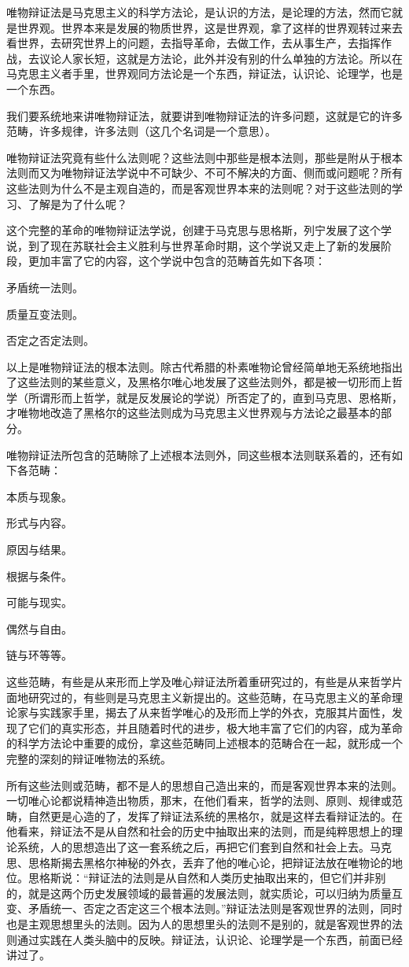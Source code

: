 唯物辩证法是马克思主义的科学方法论，是认识的方法，是论理的方法，然而它就是世界观。世界本来是发展的物质世界，这是世界观，拿了这样的世界观转过来去看世界，去研究世界上的问题，去指导革命，去做工作，去从事生产，去指挥作战，去议论人家长短，这就是方法论，此外并没有别的什么单独的方法论。所以在马克思主义者手里，世界观同方法论是一个东西，辩证法，认识论、论理学，也是一个东西。

我们要系统地来讲唯物辩证法，就要讲到唯物辩证法的许多问题，这就是它的许多范畴，许多规律，许多法则（这几个名词是一个意思）。

唯物辩证法究竟有些什么法则呢？这些法则中那些是根本法则，那些是附从于根本法则而又为唯物辩证法学说中不可缺少、不可不解决的方面、侧而或问题呢？所有这些法则为什么不是主观自造的，而是客观世界本来的法则呢？对于这些法则的学习、了解是为了什么呢？

这个完整的革命的唯物辩证法学说，创建于马克思与思格斯，列宁发展了这个学说，到了现在苏联社会主义胜利与世界革命时期，这个学说又走上了新的发展阶段，更加丰富了它的内容，这个学说中包含的范畴首先如下各项：

矛盾统一法则。

质量互变法则。

否定之否定法则。

以上是唯物辩证法的根本法则。除古代希腊的朴素唯物论曾经简单地无系统地指出了这些法则的某些意义，及黑格尔唯心地发展了这些法则外，都是被一切形而上哲学（所谓形而上哲学，就是反发展论的学说）所否定了的，直到马克思、恩格斯，才唯物地改造了黑格尔的这些法则成为马克思主义世界观与方法论之最基本的部分。

唯物辩证法所包含的范畴除了上述根本法则外，同这些根本法则联系着的，还有如下各范畴：

本质与现象。

形式与内容。

原因与结果。

根据与条件。

可能与现实。

偶然与自由。

链与环等等。

这些范畴，有些是从来形而上学及唯心辩证法所着重研究过的，有些是从来哲学片面地研究过的，有些则是马克思主义新提出的。这些范畴，在马克思主义的革命理论家与实践家手里，揭去了从来哲学唯心的及形而上学的外衣，克服其片面性，发现了它们的真实形态，并且随着时代的进步，极大地丰富了它们的内容，成为革命的科学方法论中重要的成份，拿这些范畴同上述根本的范畴合在一起，就形成一个完整的深刻的辩证唯物法的系统。

所有这些法则或范畴，都不是人的思想自己造出来的，而是客观世界本来的法则。一切唯心论都说精神造出物质，那末，在他们看来，哲学的法则、原则、规律或范畴，自然更是心造的了，发挥了辩证法系统的黑格尔，就是这样去看辩证法的。在他看来，辩证法不是从自然和社会的历史中抽取出来的法则，而是纯粹思想上的理论系统，人的思想造出了这一套系统之后，再把它们套到自然和社会上去。马克思、思格斯揭去黑格尔神秘的外衣，丢弃了他的唯心论，把辩证法放在唯物论的地位。思格斯说：“辩证法的法则是从自然和人类历史抽取出来的，但它们并非别的，就是这两个历史发展领域的最普遍的发展法则，就实质论，可以归纳为质量互变、矛盾统一、否定之否定这三个根本法则。”辩证法法则是客观世界的法则，同时也是主观思想里头的法则。因为人的思想里头的法则不是别的，就是客观世界的法则通过实践在人类头脑中的反映。辩证法，认识论、论理学是一个东西，前面已经讲过了。

